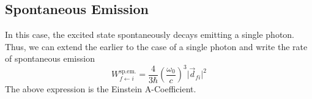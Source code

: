 \documentclass[aps,prb,onecolumn,notitlepage,showpacs,floatfix,superscriptaddress]{revtex4-1}
\newcommand{\mrm}[1]{\mathrm{#1}}
\begin{document}
\subsection{Spontaneous Emission}
In this case, the excited state spontaneously decays emitting a single photon. Thus, we can extend the earlier to the case of a single photon and write the rate of spontaneous emission
\begin{equation}
W^\mrm{sp. em.}_{f \leftarrow i} = \dfrac{4}{3\hbar} \left( \dfrac{\omega_0}{c}\right)^3 \vert \vec{d}_{fi} \vert^2
\end{equation}
The above expression is the Einstein A-Coefficient.
\end{document}
